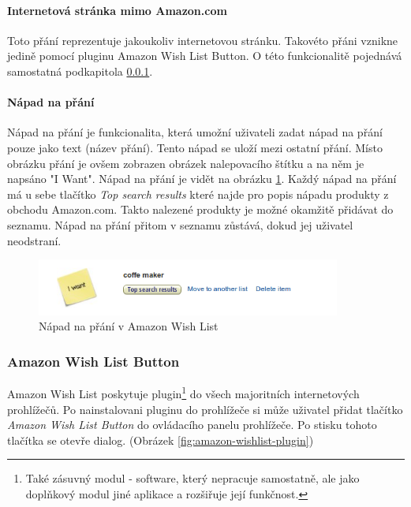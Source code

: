 \paragraph{Internetová stránka mimo Amazon.com}
Toto přání reprezentuje jakoukoliv internetovou stránku. Takovéto přáni vznikne jedině pomocí pluginu Amazon Wish List Button. O této funkcionalitě pojednává samostatná podkapitola \ref{sec:amazon-wishlist-button}.

\paragraph{Nápad na přání}
Nápad na přání je funkcionalita, která umožní uživateli zadat nápad na přání pouze jako text (název přání). Tento nápad se uloží mezi ostatní přání. Místo obrázku přání je ovšem zobrazen obrázek nalepovacího štítku a na něm je napsáno "I Want". Nápad na přání je vidět na obrázku \ref{fig:amazon-wishlist-idea}. Každý nápad na přání má u sebe tlačítko \emph{Top search results} které najde pro popis nápadu produkty z obchodu Amazon.com. Takto nalezené produkty je možné okamžitě přidávat do seznamu. Nápad na přání přitom v seznamu zůstává, dokud jej uživatel neodstraní.

\begin{figure}[htb]
\begin{center}
\includegraphics[width=100mm]{./pictures/amazon-wishlist-idea.png}
\caption{Nápad na přání v Amazon Wish List}
\label{fig:amazon-wishlist-idea}
\end{center}
\end{figure}

\subsubsection{Amazon Wish List Button}
\label{sec:amazon-wishlist-button}
Amazon Wish List poskytuje plugin\footnote{Také zásuvný modul - software, který nepracuje samostatně, ale jako doplňkový modul jiné aplikace a rozšiřuje její funkčnost.} do všech majoritních internetových prohlížečů\cite{website:amazon:plugin}. Po nainstalovani pluginu do prohlížeče si může uživatel přidat tlačítko \emph{Amazon Wish List Button} do ovládacího panelu prohlížeče. Po stisku tohoto tlačítka se otevře dialog. (Obrázek \ref{fig:amazon-wishlist-plugin})

